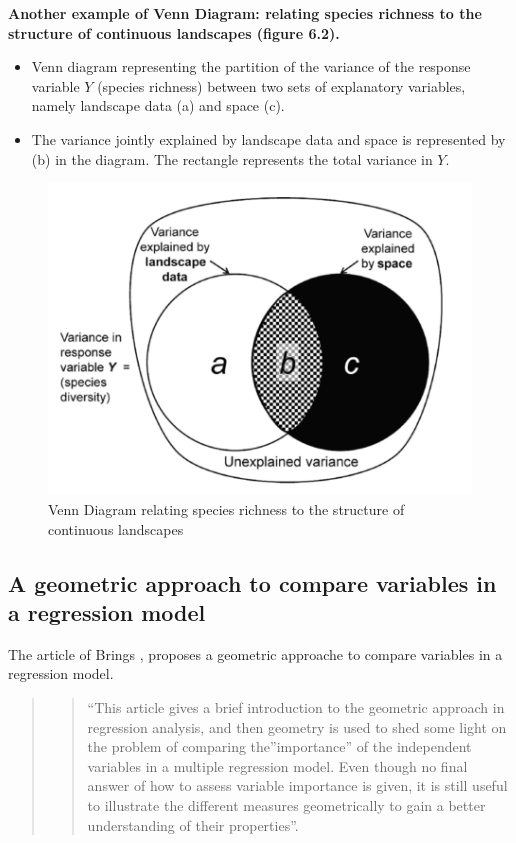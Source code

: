 \documentclass[
]{report}
\providecommand{\tightlist}{%
  \setlength{\itemsep}{0pt}\setlength{\parskip}{0pt}}
\begin{document}
\textbf{Another example of Venn Diagram: relating species richness to the structure of continuous landscapes (figure 6.2).}

\begin{itemize}
\tightlist
\item
  Venn diagram representing the partition of the variance of the response variable \(Y\) (species richness) between two sets of explanatory variables, namely landscape data (a) and space (c).
\item
  The variance jointly explained by landscape data and space is represented by (b) in the diagram. The rectangle represents the total variance in \(Y\).
\end{itemize}

\begin{figure}
    \centering
    \includegraphics[width= 250 pt]{venn.PNG}
    \caption{Venn Diagram relating species richness to the structure of continuous landscapes}
\end{figure}

\hypertarget{a-geometric-approach-to-compare-variables-in-a-regression-model}{%
\subsection{A geometric approach to compare variables in a regression model}\label{a-geometric-approach-to-compare-variables-in-a-regression-model}}

The article of Brings \citep{Bring}, proposes a geometric approache to compare variables in a regression model.

\begin{quote}
\begin{quote}
``This article gives a brief introduction to the geometric approach in regression analysis, and then geometry is used to shed some light on the problem of comparing the''importance'' of the independent variables in a multiple regression model. Even though no final answer of how to assess variable importance is given, it is still useful to illustrate the different measures geometrically to gain a better understanding of their properties''.
\end{quote}
\end{quote}
\end{document}
